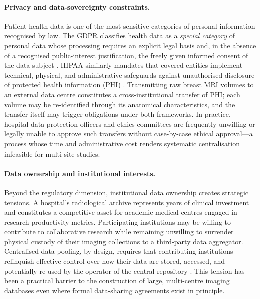 \paragraph{Privacy and data-sovereignty constraints.}
Patient health data is one of the most sensitive categories of personal
information recognised by law.
The GDPR classifies health data as a \emph{special category} of
personal data whose processing requires an explicit legal basis and, in
the absence of a recognised public-interest justification, the freely
given informed consent of the data subject
\cite{gdpr2016regulation}.
HIPAA similarly mandates that covered entities implement technical,
physical, and administrative safeguards against unauthorised disclosure
of protected health information (PHI) \cite{hipaa1996health}.
Transmitting raw breast MRI volumes to an external data centre
constitutes a cross-institutional transfer of PHI; each volume may be
re-identified through its anatomical characteristics, and the transfer
itself may trigger obligations under both frameworks.
In practice, hospital data protection officers and ethics committees
are frequently unwilling or legally unable to approve such transfers
without case-by-case ethical approval—a process whose time and
administrative cost renders systematic centralisation infeasible for
multi-site studies.

\paragraph{Data ownership and institutional interests.}
Beyond the regulatory dimension, institutional data ownership creates
strategic tensions.
A hospital's radiological archive represents years of clinical
investment and constitutes a competitive asset for academic medical
centres engaged in research productivity metrics.
Participating institutions may be willing to contribute to collaborative
research while remaining unwilling to surrender physical custody of
their imaging collections to a third-party data aggregator.
Centralised data pooling, by design, requires that contributing
institutions relinquish effective control over how their data are
stored, accessed, and potentially re-used by the operator of the
central repository \cite{rieke2020future}.
This tension has been a practical barrier to the construction of
large, multi-centre imaging databases even where formal data-sharing
agreements exist in principle.

